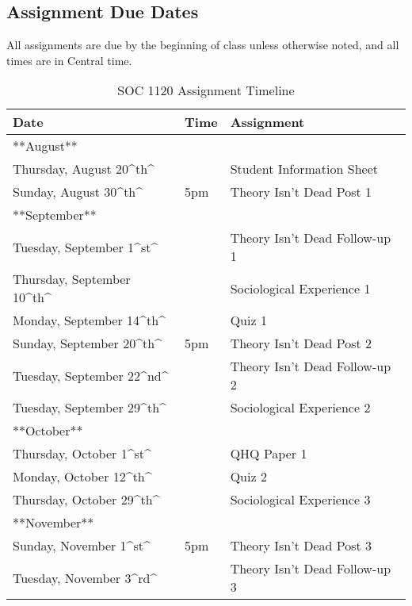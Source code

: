\documentclass[
]{book}
\begin{document}
\hypertarget{assignment-due-dates}{%
\subsection{Assignment Due Dates}\label{assignment-due-dates}}

All assignments are due by the beginning of class unless otherwise noted, and all times are in Central time.

\begin{table}

\caption{\label{tab:unnamed-chunk-2}SOC 1120 Assignment Timeline}
\centering
\begin{tabular}[t]{lll}
\toprule
Date & Time & Assignment\\
\midrule
**August** &  & \\
Thursday, August 20\textasciicircum{}th\textasciicircum{} &  & Student Information Sheet\\
Sunday, August 30\textasciicircum{}th\textasciicircum{} & 5pm & Theory Isn't Dead Post 1\\
**September** &  & \\
Tuesday, September 1\textasciicircum{}st\textasciicircum{} &  & Theory Isn't Dead Follow-up 1\\
\addlinespace
Thursday, September 10\textasciicircum{}th\textasciicircum{} &  & Sociological Experience 1\\
Monday, September 14\textasciicircum{}th\textasciicircum{} &  & Quiz 1\\
Sunday, September 20\textasciicircum{}th\textasciicircum{} & 5pm & Theory Isn't Dead Post 2\\
Tuesday, September 22\textasciicircum{}nd\textasciicircum{} &  & Theory Isn't Dead Follow-up 2\\
Tuesday, September 29\textasciicircum{}th\textasciicircum{} &  & Sociological Experience 2\\
\addlinespace
**October** &  & \\
Thursday, October 1\textasciicircum{}st\textasciicircum{} &  & QHQ Paper 1\\
Monday, October 12\textasciicircum{}th\textasciicircum{} &  & Quiz 2\\
Thursday, October 29\textasciicircum{}th\textasciicircum{} &  & Sociological Experience 3\\
**November** &  & \\
\addlinespace
Sunday, November 1\textasciicircum{}st\textasciicircum{} & 5pm & Theory Isn't Dead Post 3\\
Tuesday, November 3\textasciicircum{}rd\textasciicircum{} &  & Theory Isn't Dead Follow-up 3\\

\end{tabular}
\end{table}
\end{document}

